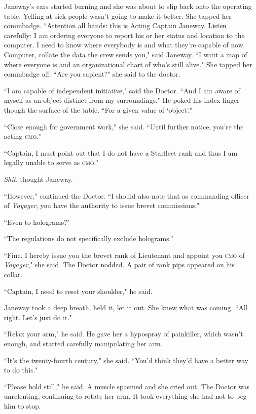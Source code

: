 \documentclass[twoside,letterpaper,12pt]{memoir}
\begin{document}
Janeway's ears started burning and she was about to slip back onto the operating table. Yelling at sick people wasn't going to make it better. She tapped her commbadge. ``Attention all hands: this is Acting Captain Janeway. Listen carefully: I am ordering everyone to report his or her status and location to the computer. I need to know where everybody is and what they're capable of now. Computer, collate the data the crew sends you," said Janeway. ``I want a map of where everyone is and an organizational chart of who's still alive." She tapped her commbadge off. ``Are you sapient?" she said to the doctor.

``I am capable of independent initiative," said the Doctor. ``And I am aware of myself as an object distinct from my surroundings." He poked his index finger though the surface of the table. ``For a given value of `object'."

``Close enough for government work," she said. ``Until further notice, you're the acting \textsc{cmo}."

``Captain, I must point out that I do not have a Starfleet rank and thus I am legally unable to serve as \textsc{cmo}."

\textit{Shit}, thought Janeway.

``However," continued the Doctor. ``I should also note that as commanding officer of \textit{Voyager}, you have the authority to issue brevet commissions."

``Even to holograms?"

``The regulations do not specifically exclude holograms."

``Fine. I hereby issue you the brevet rank of Lieutenant and appoint you \textsc{cmo} of \textit{Voyager}," she said. The Doctor nodded. A pair of rank pips appeared on his collar.

``Captain, I need to reset your shoulder," he said.

Janeway took a deep breath, held it, let it out. She knew what was coming. ``All right. Let's just do it."

``Relax your arm," he said. He gave her a hypospray of painkiller, which wasn't enough, and started carefully manipulating her arm.

``It's the twenty-fourth century," she said. ``You'd think they'd have a better way to do this."

``Please hold still," he said. A muscle spasmed and she cried out. The Doctor was unrelenting, continuing to rotate her arm. It took everything she had not to beg him to stop.
\end{document}
